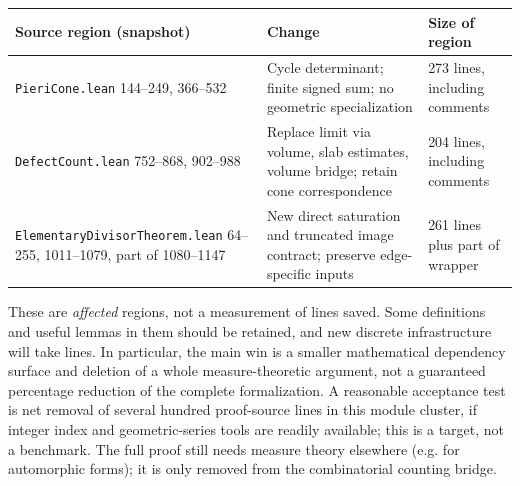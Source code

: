 \documentclass[11pt]{article}
\theoremstyle{remark}\newtheorem{remark}[theorem]{Remark}
\newcommand{\code}[1]{\texttt{#1}}
\begin{document}
\begin{center}\small
\begin{tabular}{p{.30\linewidth}p{.31\linewidth}p{.28\linewidth}}\toprule
Source region (snapshot) & Change & Size of region\\\midrule
\code{PieriCone.lean} 144--249, 366--532 & Cycle determinant; finite signed sum; no geometric specialization & 273 lines, including comments\\
\code{DefectCount.lean} 752--868, 902--988 & Replace limit via volume, slab estimates, volume bridge; retain cone correspondence & 204 lines, including comments\\
\code{ElementaryDivisor}\newline\code{Theorem.lean} 64--255, 1011--1079, part of 1080--1147 & New direct saturation and truncated image contract; preserve edge-specific inputs & 261 lines plus part of wrapper\\\bottomrule
\end{tabular}
\end{center}
These are \emph{affected} regions, not a measurement of lines saved. Some definitions and useful lemmas in them should be retained, and new discrete infrastructure will take lines. In particular, the main win is a smaller mathematical dependency surface and deletion of a whole measure-theoretic argument, not a guaranteed percentage reduction of the complete formalization. A reasonable acceptance test is net removal of several hundred proof-source lines in this module cluster, if integer index and geometric-series tools are readily available; this is a target, not a benchmark. The full proof still needs measure theory elsewhere (e.g. for automorphic forms); it is only removed from the combinatorial counting bridge.
\end{document}
